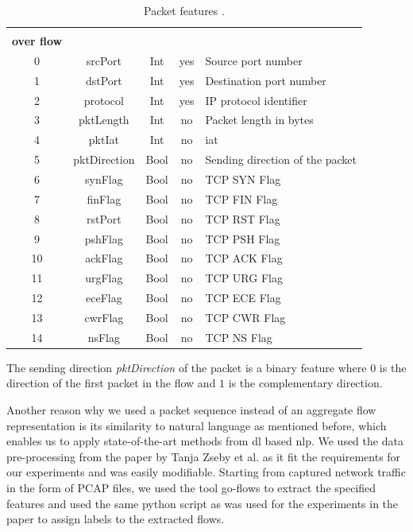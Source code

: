 \begin{table}[h]
	\centering
	\begin{tabular}{c c c c l}
		\thead{\textbf{\#}} & \thead{\textbf{Name}} & \thead{\textbf{Type}} & \thead{\textbf{Constant} \\ \textbf{over flow}} & \thead{\textbf{Description}} \\ \hline \midrule
		0 & srcPort & Int & yes & Source port number \\ \midrule
		1 & dstPort & Int & yes & Destination port number \\ \midrule
		2 & protocol & Int & yes & IP protocol identifier \\ \midrule
		3 & pktLength & Int & no & Packet length in bytes \\ \midrule
		4 & pktIat & Int & no & \gls{iat} \\ \midrule
		5 & pktDirection & Bool & no & Sending direction of the packet \\ \midrule
		6 & synFlag & Bool & no & TCP SYN Flag \\ \midrule
		7 & finFlag & Bool & no & TCP FIN Flag \\ \midrule
		8 & rstPort & Bool & no & TCP RST Flag \\ \midrule
		9 & pshFlag & Bool & no & TCP PSH Flag \\ \midrule
		10 & ackFlag & Bool & no & TCP ACK Flag \\ \midrule
		11 & urgFlag & Bool & no & TCP URG Flag \\ \midrule
		12 & eceFlag & Bool & no & TCP ECE Flag \\ \midrule
		13 & cwrFlag & Bool & no & TCP CWR Flag \\ \midrule
		14 & nsFlag & Bool & no & TCP NS Flag \\ \midrule
	\end{tabular}
	\caption{Packet features \cite{cic_ids_2017_analysis}.}
	\label{table:methodology:data_representation:features}
\end{table}

The sending direction \textit{pktDirection} of the packet is a binary feature where $0$ is the direction of the first packet in the flow and $1$ is the complementary direction.

Another reason why we used a packet sequence instead of an aggregate flow representation is its similarity to natural language as mentioned before, which enables us to apply state-of-the-art methods from \gls{dl} based \gls{nlp}. We used the data pre-processing from the paper \cite{adversarial_recurrent_ids} by Tanja Zseby et al. as it fit the requirements for our experiments and was easily modifiable. Starting from captured network traffic in the form of PCAP files, we used the tool go-flows \cite{go_flows} to extract the specified features and used the same python script as was used for the experiments in the paper \cite{adversarial_recurrent_ids} to assign labels to the extracted flows.

